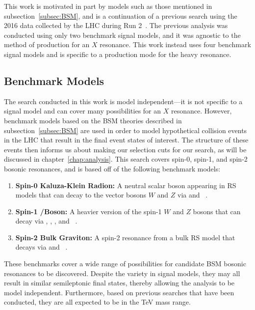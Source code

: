 This work is motivated in part by models such as those mentioned in subsection~\ref{subsec:BSM}, and is a continuation of a previous search using the 2016 data collected by the LHC during Run 2~\cite{Sirunyan_18}.
The previous analysis was conducted using only two benchmark signal models, and it was agnostic to the method of production for an $X$ resonance.
This work instead uses four benchmark signal models and is specific to a \VBF production mode for the heavy resonance.

\subsection{Benchmark Models}
\label{subsec:benchmark}

The search conducted in this work is model independent---it is not specific to a signal model and can cover many possibilities for an $X$ resonance.
However, benchmark models based on the BSM theories described in subsection~\ref{subsec:BSM} are used in order to model hypothetical collision events in the LHC that result in the final event states of interest.
The structure of these events then informs us about making our selection cuts for our search, as will be discussed in chapter~\ref{chap:analysis}.
This search covers spin-0, spin-1, and spin-2 bosonic resonances, and is based off of the following benchmark models:
\begin{enumerate}
  \item \textbf{Spin-0 Kaluza-Klein Radion:} A neutral scalar boson appearing in RS models that can decay to the vector bosons $W$ and $Z$ via \RadtoWW and \RadtoZZ~\cite{Goldberger_1999,Goldberger_2000}.
  \item \textbf{Spin-1 \Wpr/\Zpr Boson:} A heavier version of the spin-1 $W$ and $Z$ bosons that can decay via \WprtoWZ, \WprtoWH, \ZprtoWW, and \ZprtoZZ~\cite{Pappadopulo_2014}.
  \item \textbf{Spin-2 Bulk Graviton:} A spin-2 resonance from a bulk RS model that decays via \GBulktoWW and \GBulktoZZ~\cite{Fitzpatrick_2007,PhysRevD.76.036006}.
\end{enumerate}

These benchmarks cover a wide range of possibilities for candidate BSM bosonic resonances to be discovered.
Despite the variety in signal models, they may all result in similar semileptonic final states, thereby allowing the analysis to be model independent.
Furthermore, based on previous searches that have been conducted, they are all expected to be in the TeV mass range. %

